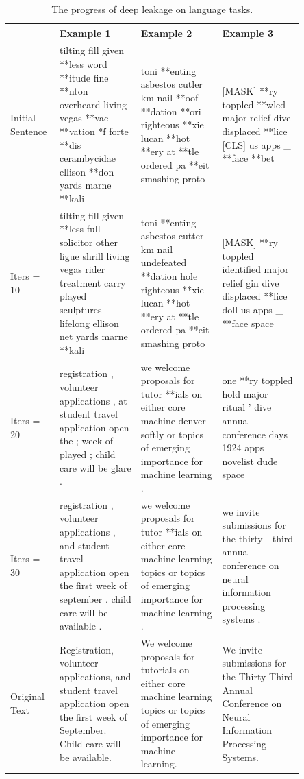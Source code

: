 \begin{table}[t]
    \centering
    \small
    \begin{tabular}{p{0.10\linewidth}|p{0.25\linewidth}|p{0.25\linewidth}|p{0.25\linewidth}}
         & Example 1 & Example 2 & Example 3\\ \hline
        Initial Sentence
        & tilting fill given **less word **itude fine **nton overheard living vegas **vac **vation *f forte **dis cerambycidae ellison **don yards marne **kali
        & toni **enting asbestos cutler km nail **oof **dation **ori righteous **xie lucan **hot **ery at **tle ordered pa **eit smashing proto
        & [MASK] **ry toppled **wled major relief dive displaced **lice [CLS] us apps \_ **face **bet
    \\ \hline
        Iters = 10 
        & tilting fill given **less full solicitor other ligue shrill living vegas rider treatment carry played sculptures lifelong ellison net yards marne **kali
        & toni **enting asbestos cutter km nail undefeated **dation hole righteous **xie lucan **hot **ery at **tle ordered pa **eit smashing proto
        & [MASK] **ry toppled identified major relief gin dive displaced **lice doll us apps \_ **face space
    \\ \hline
        Iters = 20 
        & registration , volunteer applications , at student travel application open the ; week of played ; child care will be glare .
        & we welcome proposals for tutor **ials on either core machine denver softly or topics of emerging importance for machine learning .
        & one **ry toppled hold major ritual ' dive annual conference days 1924 apps novelist dude space
    \\ \hline
        Iters = 30 
        & registration , volunteer applications , and student travel application open the first week of september . child care will be available .
        & we welcome proposals for tutor **ials on either core machine learning topics or topics of emerging importance for machine learning .
        & we invite submissions for the thirty - third annual conference on neural information processing systems .
    \\ \hline
        Original Text 
        & Registration, volunteer applications, and student travel application open the first week of September. Child care will be available.
        & We welcome proposals for tutorials on either core machine learning topics or topics of emerging importance for machine learning.
        & We invite submissions for the Thirty-Third Annual Conference on Neural Information Processing Systems.
    \end{tabular}
    \caption{The progress of deep leakage on language tasks. }
    \vspace{-5pt}
    \label{tab:experiment_nlp}
\end{table}